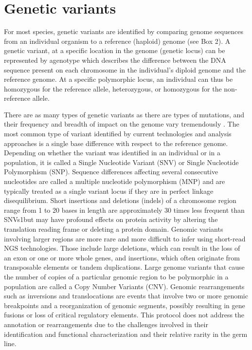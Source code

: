 \section{Genetic variants}

For most species, genetic variants are identified by comparing genome sequences from an individual organism to a reference (haploid) genome (see Box 2). A genetic variant, at a specific location in the genome (genetic locus) can be represented by agenotype which describes the difference between the DNA sequence present on each chromosome in the individual’s diploid genome and the reference genome. At a specific polymorphic locus, an individual can thus be homozygous for the reference allele, heterozygous, or homozygous for the non-reference allele.

There are as many types of genetic variants as there are types of mutations, and their frequency and breadth of impact on the genome vary tremendously \cite{ng2009targeted}. The most common type of variant identified by current technologies and analysis approaches is a single base difference with respect to the reference genome. Depending on whether the variant was identified in an individual or in a population, it is called a Single Nucleotide Variant (SNV) or Single Nucleotide Polymorphism (SNP). Sequence differences affecting several consecutive nucleotides are called a multiple nucleotide polymorphism (MNP) and are typically treated as a single variant locus if they are in perfect linkage disequilibrium. Short insertions and deletions (indels) of a chromosome region range from 1 to 20 bases in length are approximately 30 times less frequent than SNVs1but may have profound effects on protein activity by altering the translation reading frame or deleting a protein domain. Genomic variants involving larger regions are more rare and more difficult to infer using short-read NGS technologies. Those include large deletions, which can result in the loss of an exon or one or more whole genes, and insertions, which often originate from transposable elements or tandem duplications. Large genome variants that cause the number of copies of a particular genomic region to be polymorphic in a population are called a Copy Number Variants (CNV). Genomic rearrangements such as inversions and translocations are events that involve two or more genomic breakpoints and a reorganization of genomic segments, possibly resulting in gene fusions or loss of critical regulatory elements. This protocol does not address the annotation or rearrangements due to the challenges involved in their identification and functional characterization and their relative rarity in the germ line.

